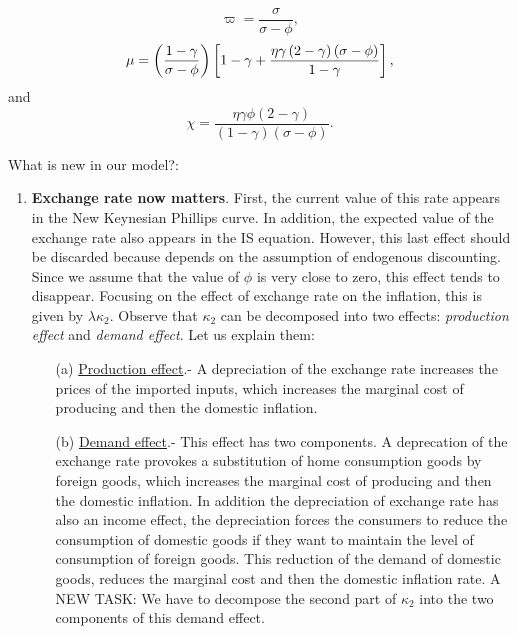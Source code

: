 \documentclass{article}
\begin{document}
\begin{equation*}
\varpi =\frac{\sigma }{\sigma -\phi },
\end{equation*}%
\begin{equation*}
\mu =\left( \frac{1-\gamma }{\sigma -\phi }\right) \left[ 1-\gamma +\frac{%
\eta \gamma \left( 2-\gamma \right) \left( \sigma -\phi \right) }{1-\gamma }%
\right] ,
\end{equation*}%
and%
\begin{equation*}
\chi =\frac{\eta \gamma \phi \left( 2-\gamma \right) }{\left( 1-\gamma
\right) \left( \sigma -\phi \right) }.
\end{equation*}

What is new in our model?:

\begin{enumerate}
\item \textbf{Exchange rate now matters}. First, the current value of this
rate appears in the New Keynesian Phillips curve. In addition, the expected
value of the exchange rate also appears in the IS equation. However, this
last effect should be discarded because depends on the assumption of
endogenous discounting. Since we assume that the value of $\phi $ is very
close to zero, this effect tends to disappear. Focusing on the effect of
exchange rate on the inflation, this is given by $\lambda \kappa _{2}.$
Observe that $\kappa _{2}$ can be decomposed into two effects: \textit{%
production effect} and \textit{demand effect}. Let us explain them:

\begin{itemize}
\item[(a)] \underline{Production effect}.- A depreciation of the exchange
rate increases the prices of the imported inputs, which increases the
marginal cost of producing and then the domestic inflation.

\item[(b)] \underline{Demand effect}.- This effect has two components. A
deprecation of the exchange rate provokes a substitution of home consumption
goods by foreign goods, which increases the marginal cost of producing and
then the domestic inflation. In addition the depreciation of exchange rate
has also an income effect, the depreciation forces the consumers to reduce
the consumption of domestic goods if they want to maintain the level of
consumption of foreign goods. This reduction of the demand of domestic
goods, reduces the marginal cost and then the domestic inflation rate. A NEW
TASK: We have to decompose the second part of $\kappa _{2}$ into the two
components of this demand effect.
\end{itemize}


\end{enumerate}
\end{document}
